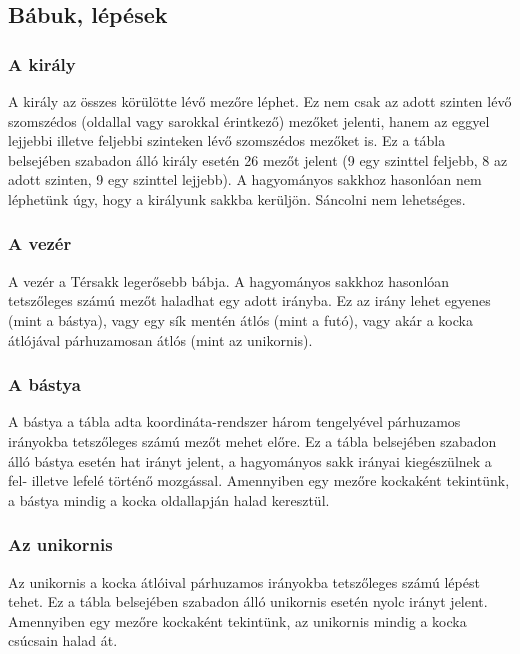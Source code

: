 \documentclass[12pt, twoside]{report}
\begin{document}
\subsection{Bábuk, lépések}

\subsubsection{A király}

A király az összes körülötte lévő mezőre léphet. Ez nem csak az adott szinten lévő szomszédos (oldallal vagy sarokkal érintkező) mezőket jelenti, hanem az eggyel lejjebbi illetve feljebbi szinteken lévő szomszédos mezőket is. Ez a tábla belsejében szabadon álló király esetén 26 mezőt jelent (9 egy szinttel feljebb, 8 az adott szinten, 9 egy szinttel lejjebb). A hagyományos sakkhoz hasonlóan nem léphetünk úgy, hogy a királyunk sakkba kerüljön. Sáncolni nem lehetséges.

\subsubsection{A vezér}

A vezér a Térsakk legerősebb bábja. A hagyományos sakkhoz hasonlóan tetszőleges számú mezőt haladhat egy adott irányba. Ez az irány lehet egyenes (mint a bástya), vagy egy sík mentén átlós (mint a futó), vagy akár a kocka átlójával párhuzamosan átlós (mint az unikornis).

\subsubsection{A bástya}

A bástya a tábla adta koordináta-rendszer három tengelyével párhuzamos irányokba tetszőleges számú mezőt mehet előre. Ez a tábla belsejében szabadon álló bástya esetén hat irányt jelent, a hagyományos sakk irányai kiegészülnek a fel- illetve lefelé történő mozgással. Amennyiben egy mezőre kockaként tekintünk, a bástya mindig a kocka oldallapján halad keresztül.

\subsubsection{Az unikornis}

Az unikornis a kocka átlóival párhuzamos irányokba tetszőleges számú lépést tehet. Ez a tábla belsejében szabadon álló unikornis esetén nyolc irányt jelent. Amennyiben egy mezőre kockaként tekintünk, az unikornis mindig a kocka csúcsain halad át.
\end{document}
